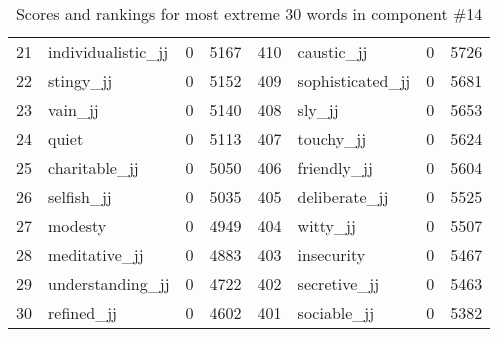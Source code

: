 \begin{table}[tbp]
\begin{tabular}{| rlr@{.}l | rlr@{.}l |}
    21 & individualistic\_jj & 0 & 5167    &    410 & caustic\_jj & 0 & 5726 \\
    22 & stingy\_jj & 0 & 5152    &    409 & sophisticated\_jj & 0 & 5681 \\
    23 & vain\_jj & 0 & 5140    &    408 & sly\_jj & 0 & 5653 \\
    24 & quiet & 0 & 5113    &    407 & touchy\_jj & 0 & 5624 \\
    25 & charitable\_jj & 0 & 5050    &    406 & friendly\_jj & 0 & 5604 \\
    26 & selfish\_jj & 0 & 5035    &    405 & deliberate\_jj & 0 & 5525 \\
    27 & modesty & 0 & 4949    &    404 & witty\_jj & 0 & 5507 \\
    28 & meditative\_jj & 0 & 4883    &    403 & insecurity & 0 & 5467 \\
    29 & understanding\_jj & 0 & 4722    &    402 & secretive\_jj & 0 & 5463 \\
    30 & refined\_jj & 0 & 4602    &    401 & sociable\_jj & 0 & 5382 \\
    \hline
    \end{tabular}
    \caption{Scores and rankings for most extreme 30 words in component \#14} 
\end{table}
\clearpage
